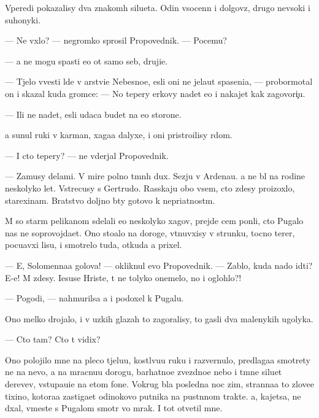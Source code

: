\documentclass[10pt]{book}
\begin{document}
Vperedi pokazalisy dva znakom{\yi}h silueta. Odin v{\yi}socenn{\yi}{\y} i dolgov{\ia}z{\yi}{\y}, drugo{\y} nev{\yi}soki{\y} i suhonyki{\y}.

— Ne v{\yi}xlo? — negromko sprosil Propovednik. — Pocemu?

— {\Y}a ne mogu spasti {\y}e{\y}o ot samo{\y} seb{\ia}, druji{\x}e.

— T{\ia}jelo vvesti l{\iu}de{\y} v {\C}arstvi{\y}e Nebesno{\y}e, {\y}esli oni ne jela{\y}ut spaseni{\y}a, — probormotal on i skazal kuda gromce: — No tepery {\C}erkovy na{\y}det {\y}e{\y}o i nakajet kak zagovor{\x}i{\c}u.

— Ili ne na{\y}det, {\y}esli udaca budet na {\y}e{\y}o storone.

{\Y}a sunul ruki v karman{\yi}, xaga{\y}a dalyxe, i oni pristro{\y}ilisy r{\ia}dom.

— I cto tepery? — ne v{\yi}derjal Propovednik.

— Za{\y}musy delami. V mire polno t{\e}mn{\yi}h dux. S{\y}ezju v Ardenau. {\Y}a ne b{\yi}l na rodine neskolyko let. Vstrecusy s Gertrudo{\y}. Rasskaju obo vsem, cto zdesy proizoxlo, stare{\y}xinam. Bratstvo doljno b{\yi}ty gotovo k nepri{\y}atnost{\ia}m.

M{\yi} so star{\yi}m pelikanom sdelali {\y}e{\x}o neskolyko xagov, prejde cem pon{\ia}li, cto Pugalo nas ne soprovojda{\y}et. Ono sto{\y}alo na doroge, v{\yi}t{\ia}nuvxisy v strunku, tocno ter{\y}er, pocu{\y}avxi{\y} lisu, i smotrelo tuda, otkuda {\y}a prixel.

— E{\y}, Solomenna{\y}a golova! — okliknul {\y}evo Propovednik. — Zab{\yi}lo, kuda nado idti? E-e{\y}! M{\yi} zdesy. Iesuse Hriste, t{\yi} ne tolyko onemelo, no i oglohlo?!

— Pogodi, — nahmurilsa {\y}a i podoxel k Pugalu.

Ono melko drojalo, i v uzkih glazah to zagoralisy, to gasli dva malenykih ugolyka.

— Cto tam? Cto t{\yi} vidix?

Ono polojilo mne na pleco t{\ia}jelu{\y}u, kostl{\ia}vu{\y}u ruku i razvernulo, predlaga{\y}a smotrety ne na nevo, a na mracnu{\y}u dorogu, barhatno{\y}e zvezdno{\y}e nebo i t{\e}mn{\yi}{\y}e siluet{\yi} derev{\y}ev, v{\yi}stupa{\y}u{\x}i{\y}e na etom fone. Vokrug b{\yi}la posledn{\ia}{\y}a noc zim{\yi}, stranna{\y}a to{\y} zlove{\x}e{\y} tixino{\y}, kotora{\y}a zastiga{\y}et odinokovo putnika na pust{\yi}nnom trakte. {\Y}a, kajetsa, ne d{\yi}xal, vmeste s Pugalom smotr{\ia} vo mrak. I tot otvetil mne.
\end{document}
